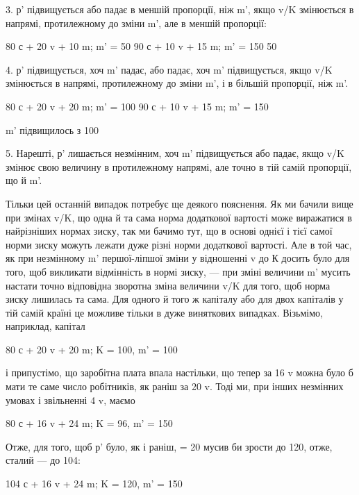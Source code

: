 3. р' підвищується або падає в меншій пропорції, ніж m',
якщо v/K змінюється в напрямі, протилежному до зміни m', але
в меншій пропорції:

80 с + 20 v + 10 m; m' = 50%
90 с + 10 v + 15 m; m' = 150%
50%

4. р' підвищується, хоч m' падає, або падає, хоч m' підвищується,
якщо v/K змінюється в напрямі, протилежному до зміни
m', і в більшій пропорції, ніж m'.

80 с + 20 v + 20 m; m' = 100%
90 с + 10 v + 15 m; m' = 150%

m' підвищилось з 100%

5. Нарешті, р' лишається незмінним, хоч m' підвищується або
падає, якщо v/K змінює свою величину в протилежному напрямі,
але точно в тій самій пропорції, що й m'.

Тільки цей останній випадок потребує ще деякого пояснення.
Як ми бачили вище при змінах v/K, що одна й та сама норма
додаткової вартості може виражатися в найрізніших нормах
зиску, так ми бачимо тут, що в основі однієї і тієї самої норми
зиску можуть лежати дуже різні норми додаткової вартості.
Але в той час, як при незмінному m' першої-ліпшої зміни у відношенні
v до К досить було для того, щоб викликати відмінність
в нормі зиску, — при зміні величини m' мусить настати точно
відповідна зворотна зміна величини v/K для того, щоб норма
зиску лишилась та сама. Для одного й того ж капіталу або для
двох капіталів у тій самій країні це можливе тільки в дуже
виняткових випадках. Візьмімо, наприклад, капітал

80 с + 20 v + 20 m; K = 100, m' = 100%

і припустімо, що заробітна плата впала настільки, що тепер за
16 v можна було б мати те саме число робітників, як раніш за
20 v. Тоді ми, при інших незмінних умовах і звільненні 4 v,
маємо

80 с + 16 v + 24 m; K = 96, m' = 150%

Отже, для того, щоб р' було, як і раніш, = 20%
мусив би зрости до 120, отже, сталий — до 104:

104 с + 16 v + 24 m; K = 120, m' = 150%
